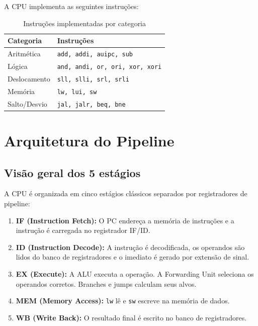 \documentclass[12pt, a4paper]{article}
\newcommand{\code}[1]{\texttt{#1}}
\begin{document}
A CPU implementa as seguintes instruções:

\begin{table}[H]
  \centering
  \caption{Instruções implementadas por categoria}
  \small{}
  \begin{tabular}{ll}
    \toprule
    \rowcolor{headerblue}
    \color{white}\textbf{Categoria} & \color{white}\textbf{Instruções} \\
    \midrule
    Aritmética   & \code{add, addi, auipc, sub} \\
    Lógica       & \code{and, andi, or, ori, xor, xori} \\
    Deslocamento     & \code{sll, slli, srl, srli} \\
    Memória      & \code{lw, lui, sw} \\
    Salto/Desvio     & \code{jal, jalr, beq, bne} \\
    \bottomrule
  \end{tabular}
\end{table}

\section{Arquitetura do Pipeline}

\subsection{Visão geral dos 5 estágios}

A CPU é organizada em cinco estágios clássicos separados por registradores
de pipeline:

\begin{enumerate}[leftmargin=2em]
  \item \textbf{IF (Instruction Fetch):} O PC endereça a memória de
    instruções e a instrução é carregada no registrador IF/ID.
  \item \textbf{ID (Instruction Decode):} A instrução é decodificada,
    os operandos são lidos do banco de registradores e o imediato é
    gerado por extensão de sinal.
  \item \textbf{EX (Execute):} A ALU executa a operação. A Forwarding Unit
    seleciona os operandos corretos. Branches e jumps calculam seus alvos.
  \item \textbf{MEM (Memory Access):} \code{lw} lê e \code{sw} escreve na
    memória de dados.
  \item \textbf{WB (Write Back):} O resultado final é escrito no banco de
    registradores.
\end{enumerate}
\end{document}
